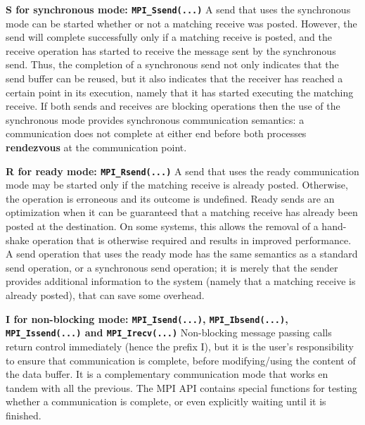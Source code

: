 \documentclass[12pt,twoside]{article}
\begin{document}
\textbf{S for synchronous mode: \texttt{MPI\_Ssend(...)}}
A send that uses the synchronous mode can be started whether or not a matching receive was posted. 
However, the send will complete successfully only if a matching receive is posted, and the receive operation has started to receive the message sent by the synchronous send.
Thus, the completion of a synchronous send not only indicates that the send buffer can be reused, 
but it also indicates that the receiver has reached a certain point in its execution, 
namely that it has started executing the matching receive. 
If both sends and receives are blocking operations then the use of the synchronous mode provides synchronous communication semantics: 
a communication does not complete at either end before both processes \textbf{rendezvous} at the communication point.

\textbf{R for ready mode: \texttt{MPI\_Rsend(...)}}
A send that uses the ready communication mode may be started only if the matching receive is already posted. 
Otherwise, the operation is erroneous and its outcome is undefined.
Ready sends are an optimization when it can be guaranteed that a matching receive has already been posted at the destination.
On some systems, this allows the removal of a hand-shake operation that is otherwise required and results in improved performance. 
A send operation that uses the ready mode has the same semantics as a standard send operation, or a synchronous send operation; 
it is merely that the sender provides additional information to the system (namely that a matching receive is already posted), that can save some overhead. 

\textbf{I for non-blocking mode: \texttt{MPI\_Isend(...)}, \texttt{MPI\_Ibsend(...)}, \texttt{MPI\_Issend(...)} and \texttt{MPI\_Irecv(...)} }
Non-blocking message passing calls return control immediately (hence the prefix I), 
but it is the user's responsibility to ensure that communication is complete, 
before modifying/using the content of the data buffer.
It is a complementary communication mode that works en tandem with all the previous.
The MPI API contains special functions for testing whether a communication is complete, or even explicitly waiting until it is finished.
\end{document}
